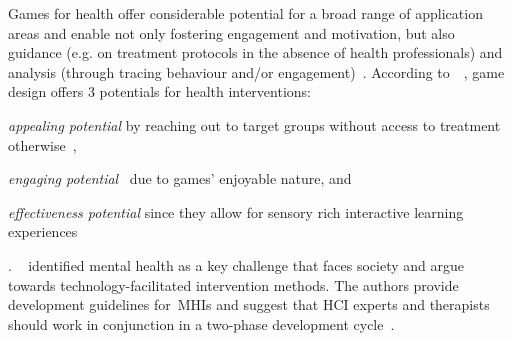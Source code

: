 Games for health offer considerable potential for a broad range of application areas and enable not only fostering engagement and motivation, but also guidance (e.g. on treatment protocols in the absence of health professionals) and analysis (through tracing behaviour and/or engagement)~\cite{smeddinck2016}.
According to~\citeauthor{fleming2017}~\cite{fleming2017}, game design offers $3$ potentials for health interventions:
\begin{enumerate*}
\item \textit{appealing potential} by reaching out to target groups without access to treatment otherwise~\cite{birk2019, fleming2017, mandryk2017}, 
\item \textit{engaging potential}~\cite{botella2017, ryan2006} due to games' enjoyable nature, and \item \textit{effectiveness potential} since they allow for sensory rich interactive learning experiences
\end{enumerate*}.
\citeauthor{coyle2007}~\cite{coyle2007} identified mental health as a key challenge that faces society and argue towards technology-facilitated intervention methods.
The authors provide development guidelines for~\acp{MHI} and suggest that HCI experts and therapists should work in conjunction in a two-phase development cycle~\cite{coyle2007}.

